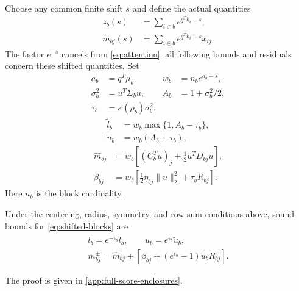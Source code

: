 Choose any common finite shift $s$ and define the actual quantities
\begin{equation}
 \begin{aligned}
 z_b(s)&=\sum_{i\in b}e^{q^Tk_i-s},\\
 m_{bj}(s)&=\sum_{i\in b}e^{q^Tk_i-s}x_{ij}.
 \end{aligned}
 \label{eq:shifted-blocks}
\end{equation}
The factor $e^{-s}$ cancels from \cref{eq:attention}; all following bounds and
residuals concern these shifted quantities. Set
\begin{equation}
 \begin{aligned}
 a_b&=q^T\mu_b, & w_b&=n_b e^{a_b-s},\\
 \sigma_b^2&=u^T\Sigma_bu, & A_b&=1+\sigma_b^2/2,\\
 \tau_b&=\kappa(\rho_b)\sigma_b^2.
 \end{aligned}
 \label{eq:moment-scalars}
\end{equation}
\begin{equation}
 \begin{aligned}
 \widetilde l_b&=w_b\max\{1,A_b-\tau_b\},\\
 \widetilde u_b&=w_b(A_b+\tau_b),
 \end{aligned}
 \label{eq:projected-mass}
\end{equation}
\begin{equation}
 \begin{aligned}
 \widehat m_{bj}&=w_b\left[(C_b^Tu)_j+\tfrac12u^TD_{bj}u\right],\\
 \beta_{bj}&=w_b\left[\tfrac12\eta_{bj}\|u\|_2^2+\tau_bR_{bj}\right].
 \end{aligned}
 \label{eq:projected-numerator}
\end{equation}
Here $n_b$ is the block cardinality.

\begin{samepage}
\begin{theorem}\label{thm:full-score-enclosures}
Under the centering, radius, symmetry, and row-sum conditions above, sound
bounds for \cref{eq:shifted-blocks} are
\begin{gather}
 l_b=e^{-\epsilon_b}\widetilde l_b,\qquad
 u_b=e^{\epsilon_b}\widetilde u_b,\label{eq:full-mass}\\
 m^\pm_{bj}=\widehat m_{bj}\pm\left[\beta_{bj}+(e^{\epsilon_b}-1)\widetilde u_bR_{bj}\right].
 \label{eq:full-numerator}
\end{gather}
\end{theorem}
\end{samepage}
The proof is given in \cref{app:full-score-enclosures}.

